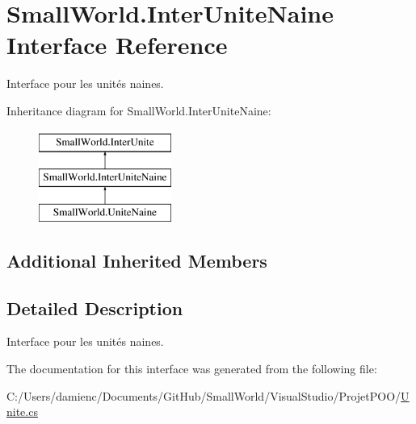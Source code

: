 \hypertarget{interface_small_world_1_1_inter_unite_naine}{\section{Small\-World.\-Inter\-Unite\-Naine Interface Reference}
\label{interface_small_world_1_1_inter_unite_naine}
}


Interface pour les unités naines.  


Inheritance diagram for Small\-World.\-Inter\-Unite\-Naine\-:\begin{figure}[H]
\begin{center}
\leavevmode
\includegraphics[height=3.000000cm]{interface_small_world_1_1_inter_unite_naine}
\end{center}
\end{figure}
\subsection*{Additional Inherited Members}


\subsection{Detailed Description}
Interface pour les unités naines. 

The documentation for this interface was generated from the following file\-:\begin{DoxyCompactItemize}
\item 
C\-:/\-Users/damienc/\-Documents/\-Git\-Hub/\-Small\-World/\-Visual\-Studio/\-Projet\-P\-O\-O/\hyperlink{_unite_8cs}{Unite.\-cs}\end{DoxyCompactItemize}
